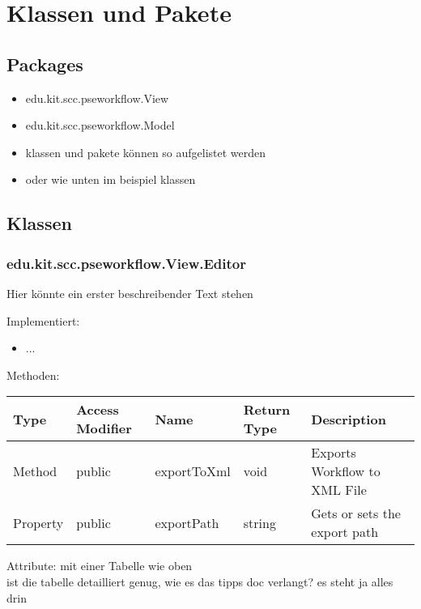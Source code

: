\chapter{Klassen und Pakete}

    \section{Packages}
        \begin{itemize}
            \item edu.kit.scc.pseworkflow.View
            \item edu.kit.scc.pseworkflow.Model
            \item klassen und pakete können so aufgelistet werden
            \item oder wie unten im beispiel klassen
        \end{itemize}
        
    \section{Klassen}
    
        \subsection{edu.kit.scc.pseworkflow.View.Editor}
        
            Hier könnte ein erster beschreibender Text stehen
            
            Implementiert:
            \begin{itemize}
                \item ...
            \end{itemize}
            
            Methoden:
            \begin{center}
            \renewcommand{\arraystretch}{1.5}
                \begin{tabular}{|l|l|l|l|l|}
                    \hline 
                    \rowcolor[gray]{0.7}
                    Type & Access Modifier & Name & Return Type & Description \\ \hline 
                    Method & public & exportToXml & void & Exports Workflow to XML File \\ \hline
                    Property & public & exportPath & string & Gets or sets the export path \\
                    \hline
                \end{tabular}
            \end{center}
                
            Attribute:
            mit einer Tabelle wie oben \\
            ist die tabelle detailliert genug, wie es das tipps doc verlangt? es steht ja alles drin